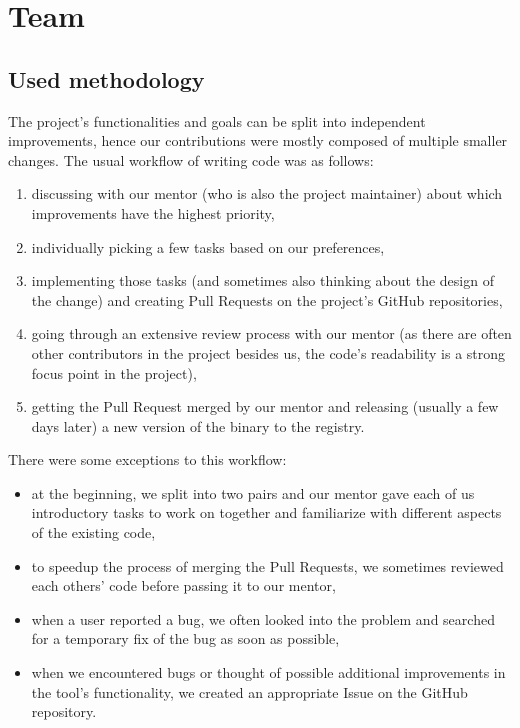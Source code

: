 \documentclass[licencjacka,en]{pracamgr}
\begin{document}
\chapter{Team}\label{r:chapter_team}

\section{Used methodology}

The project's functionalities and goals can be split into independent improvements, hence our
contributions were mostly composed of multiple smaller changes. The usual workflow of writing
code was as follows:
\begin{enumerate}
	\item discussing with our mentor (who is also the project maintainer) about which improvements
		have the highest priority,
	\item individually picking a few tasks based on our preferences,
	\item implementing those tasks (and sometimes also thinking about the design of the change)
		and creating Pull Requests on the project's GitHub repositories,
	\item going through an extensive review process with our mentor (as there are often other
		contributors in the project besides us, the code's readability is a strong focus point
		in the project),
	\item getting the Pull Request merged by our mentor and releasing (usually a few days later)
		a new version of the binary to the registry.
\end{enumerate}

There were some exceptions to this workflow:
\begin{itemize}
	\item at the beginning, we split into two pairs and our mentor gave each of us introductory
		tasks to work on together and familiarize with different aspects of the existing code,
	\item to speedup the process of merging the Pull Requests, we sometimes reviewed each others'
		code before passing it to our mentor,
	\item when a user reported a bug, we often looked into the problem and searched for a temporary
		fix of the bug as soon as possible,
	\item when we encountered bugs or thought of possible additional improvements in the tool's
		functionality, we created an appropriate Issue on the GitHub repository.
\end{itemize}
\end{document}

